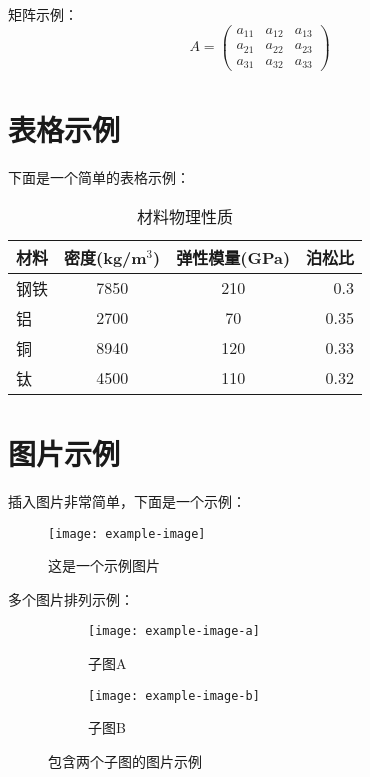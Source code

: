 \documentclass[12pt, a4paper]{ctexart} %
\begin{document}
矩阵示例：
\begin{equation}
  A = \begin{pmatrix}
    a_{11} & a_{12} & a_{13} \\
    a_{21} & a_{22} & a_{23} \\
    a_{31} & a_{32} & a_{33}
  \end{pmatrix}
\end{equation}

\section{表格示例}
下面是一个简单的表格示例：

\begin{table}[htbp]
  \centering
  \caption{材料物理性质}
  \label{tab:materials}
  \begin{tabular}{lccr}
    \toprule
    材料 & 密度(kg/m$^3$) & 弹性模量(GPa) & 泊松比 \\
    \midrule
    钢铁 & 7850 & 210 & 0.3 \\
    铝 & 2700 & 70 & 0.35 \\
    铜 & 8940 & 120 & 0.33 \\
    钛 & 4500 & 110 & 0.32 \\
    \bottomrule
  \end{tabular}
\end{table}

\section{图片示例}
插入图片非常简单，下面是一个示例：

\begin{figure}[htbp]
  \centering
  \texttt{[image: example-image]}
  \caption{这是一个示例图片}
  \label{fig:example}
\end{figure}

多个图片排列示例：
\begin{figure}[htbp]
  \centering
  \begin{subfigure}{0.45\textwidth}
    \texttt{[image: example-image-a]}
    \caption{子图A}
    \label{fig:sub-a}
  \end{subfigure}
  \hfill
  \begin{subfigure}{0.45\textwidth}
    \texttt{[image: example-image-b]}
    \caption{子图B}
    \label{fig:sub-b}
  \end{subfigure}
  \caption{包含两个子图的图片示例}
  \label{fig:subfigures}
\end{figure}
\end{document}
